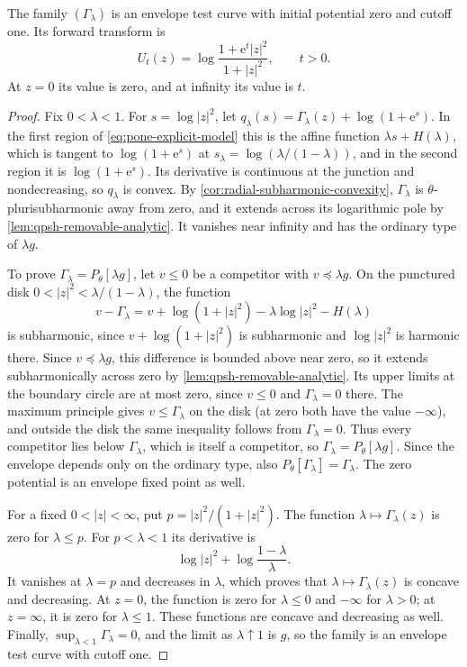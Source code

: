 \begin{proposition}\label{prop:pone-explicit-testcurve}
The family $(\Gamma_\lambda)$ is an envelope test curve with initial potential zero and cutoff one. Its forward transform is
\begin{equation}\label{eq:pone-explicit-ray}
 U_t(z)=\log\frac{1+\mathrm{e}^t|z|^2}{1+|z|^2},\qquad t>0.
\end{equation}
At $z=0$ its value is zero, and at infinity its value is $t$.
\end{proposition}
\begin{proof}
Fix $0<\lambda<1$. For $s=\log|z|^2$, let $q_\lambda(s)=\Gamma_\lambda(z)+\log(1+\mathrm{e}^s)$. In the first region of \eqref{eq:pone-explicit-model} this is the affine function $\lambda s+H(\lambda)$, which is tangent to $\log(1+\mathrm{e}^s)$ at $s_\lambda=\log(\lambda/(1-\lambda))$, and in the second region it is $\log(1+\mathrm{e}^s)$. Its derivative is continuous at the junction and nondecreasing, so $q_\lambda$ is convex. By \cref{cor:radial-subharmonic-convexity}, $\Gamma_\lambda$ is $\theta$-plurisubharmonic away from zero, and it extends across its logarithmic pole by \cref{lem:qpsh-removable-analytic}. It vanishes near infinity and has the ordinary type of $\lambda g$.

To prove $\Gamma_\lambda=P_\theta[\lambda g]$, let $v\leq0$ be a competitor with $v\preceq\lambda g$. On the punctured disk $0<|z|^2<\lambda/(1-\lambda)$, the function
\[
 v-\Gamma_\lambda
 =v+\log(1+|z|^2)-\lambda\log|z|^2-H(\lambda)
\]
is subharmonic, since $v+\log(1+|z|^2)$ is subharmonic and $\log|z|^2$ is harmonic there. Since $v\preceq\lambda g$, this difference is bounded above near zero, so it extends subharmonically across zero by \cref{lem:qpsh-removable-analytic}. Its upper limits at the boundary circle are at most zero, since $v\leq0$ and $\Gamma_\lambda=0$ there. The maximum principle gives $v\leq\Gamma_\lambda$ on the disk (at zero both have the value $-\infty$), and outside the disk the same inequality follows from $\Gamma_\lambda=0$. Thus every competitor lies below $\Gamma_\lambda$, which is itself a competitor, so $\Gamma_\lambda=P_\theta[\lambda g]$. Since the envelope depends only on the ordinary type, also $P_\theta[\Gamma_\lambda]=\Gamma_\lambda$. The zero potential is an envelope fixed point as well.

For a fixed $0<|z|<\infty$, put $p=|z|^2/(1+|z|^2)$. The function $\lambda\mapsto\Gamma_\lambda(z)$ is zero for $\lambda\leq p$. For $p<\lambda<1$ its derivative is
\[
 \log|z|^2+\log\frac{1-\lambda}{\lambda}.
\]
It vanishes at $\lambda=p$ and decreases in $\lambda$, which proves that $\lambda\mapsto\Gamma_\lambda(z)$ is concave and decreasing. At $z=0$, the function is zero for $\lambda\leq0$ and $-\infty$ for $\lambda>0$; at $z=\infty$, it is zero for $\lambda\leq1$. These functions are concave and decreasing as well. Finally, $\sup_{\lambda<1}\Gamma_\lambda=0$, and the limit as $\lambda\uparrow1$ is $g$, so the family is an envelope test curve with cutoff one.


\end{proof}
